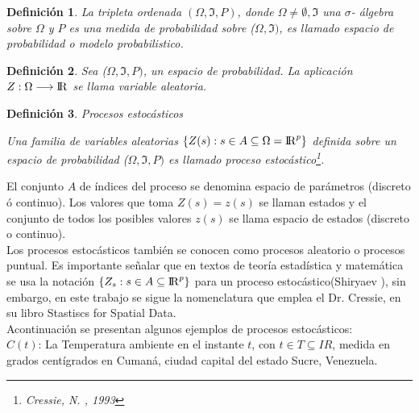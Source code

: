 \documentclass[12pt]{report}
\newtheorem{defi}{{\bf Definición}}[chapter]
\begin{document}
	
	
	
	
	
	
	
	
	\begin{defi}
		
		La tripleta ordenada $(\Omega, \Im, P )$,  donde  $\Omega   \neq   \emptyset,   \Im$  una  $\sigma$- álgebra sobre $\Omega$ y $ P$ es una medida de probabilidad sobre ($\Omega, \Im)$, es llamado espacio de probabilidad o modelo probabilistico.
		
	\end{defi}
	
	
	
	
	\begin{defi}
		
		
		Sea ($\Omega, \Im, P)$, un espacio de probabilidad. La aplicación \\
		 $Z  :\Omega \longrightarrow {\rm I\!R}$ se llama variable aleatoria.
	\end{defi}
	
	
	\begin{defi}{Procesos estocásticos}
		
		Una familia de variables aleatorias $\{Z(s) :s \in A \subseteq \Omega = {\rm I\!R}^{p}\}$ definida sobre un espacio de probabilidad ($\Omega, \Im, P )$ es llamado  proceso estocástico{\footnote{Cressie, N. , 1993}}.
		
	\end{defi}
	
	El conjunto $A$ de índices del proceso se denomina espacio de parámetros (discreto  ó continuo). Los valores que toma $Z(s) =z(s)$ se llaman estados y el conjunto de todos los posibles valores  $z(s)$ se llama espacio de estados (discreto o continuo). \\
	
	Los procesos estocásticos también se conocen como procesos aleatorio o procesos puntual. Es importante señalar que en textos de teoría estadística y matemática se usa la notación  $\{Z_{s} :s \in A \subseteq {\rm I\!R}^{p}\}$  para un proceso estocástico(Shiryaev \cite{Shir}), sin embargo, en este trabajo se  sigue la nomenclatura que emplea el Dr. Cressie, en su libro Stastiscs for Spatial Data. \\
	
	Acontinuación se presentan algunos ejemplos de procesos estocásticos: \\
	
	$ C(t)$: La Temperatura ambiente en el instante $t$, con $ t \in T \subseteq I\!R$, medida en grados centígrados en Cumaná, ciudad  capital del  estado Sucre, Venezuela.\\ 
	
\end{document}
